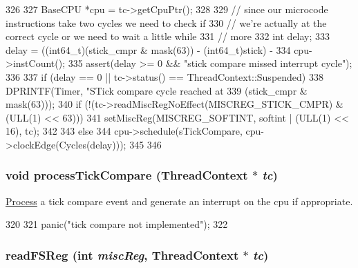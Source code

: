 \begin{DoxyCode}
326 {
327     BaseCPU *cpu = tc->getCpuPtr();
328 
329     // since our microcode instructions take two cycles we need to check if
330     // we're actually at the correct cycle or we need to wait a little while
331     // more
332     int delay;
333     delay = ((int64_t)(stick_cmpr & mask(63)) - (int64_t)stick) -
334         cpu->instCount();
335     assert(delay >= 0 && "stick compare missed interrupt cycle");
336 
337     if (delay == 0 || tc->status() == ThreadContext::Suspended) {
338         DPRINTF(Timer, "STick compare cycle reached at %
339                 (stick_cmpr & mask(63)));
340         if (!(tc->readMiscRegNoEffect(MISCREG_STICK_CMPR) & (ULL(1) << 63))) {
341             setMiscReg(MISCREG_SOFTINT, softint | (ULL(1) << 16), tc);
342         }
343     } else {
344         cpu->schedule(sTickCompare, cpu->clockEdge(Cycles(delay)));
345     }
346 }
\end{DoxyCode}
\hypertarget{classSparcISA_1_1ISA_a6c81ced7d761098b6a3b733c6e70e041}{
\subsubsection[{processTickCompare}]{\setlength{\rightskip}{0pt plus 5cm}void processTickCompare ({\bf ThreadContext} $\ast$ {\em tc})}}
\label{classSparcISA_1_1ISA_a6c81ced7d761098b6a3b733c6e70e041}
\hyperlink{classProcess}{Process} a tick compare event and generate an interrupt on the cpu if appropriate. 


\begin{DoxyCode}
320 {
321     panic("tick compare not implemented\n");
322 }
\end{DoxyCode}
\hypertarget{classSparcISA_1_1ISA_ae5670dc7b39c2d746bb37c321aea7c6f}{
\subsubsection[{readFSReg}]{ readFSReg (int {\em miscReg}, \/  {\bf ThreadContext} $\ast$ {\em tc})}}
\label{classSparcISA_1_1ISA_ae5670dc7b39c2d746bb37c321aea7c6f}



